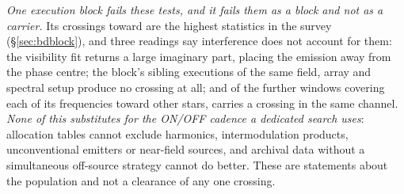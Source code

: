 \emph{One execution block fails these tests, and it fails them as a block
and not as a carrier.} Its \DqBlockNCross{} crossings toward
\LgVerRejectStar{} are the \DqBlockNCross{} highest statistics in the survey
(\S\ref{sec:bdblock}), and three readings say interference does not account
for them: the visibility fit returns a large imaginary part, placing the
emission away from the phase centre; the block's \BdNSibling{} sibling
executions of the same field, array and spectral setup produce no crossing at
all; and of the further windows covering each of its frequencies toward other
stars, \DqOtherSame{} carries a crossing in the same channel.
\emph{None of this substitutes for the ON/OFF cadence a dedicated search
uses}: allocation tables cannot exclude harmonics, intermodulation products,
unconventional emitters or near-field sources, and archival data without a
simultaneous off-source strategy cannot do better. These are statements about
the population and not a clearance of any one crossing.

